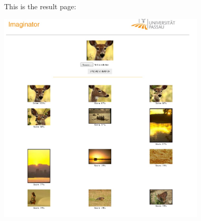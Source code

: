 \documentclass{llncs}
\begin{document}
This is the result page:
\begin{center}
	\includegraphics[width=10cm]{images/results.jpg}
\end{center}



\end{document}
